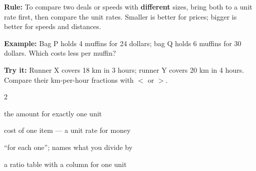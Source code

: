 \documentclass[12pt]{article}
\begin{document}

\begin{formulabox}
\textbf{Rule:} To compare two deals or speeds with \textbf{different} sizes,
bring both to a unit rate first, then compare the unit rates. Smaller is better
for prices; bigger is better for speeds and distances.
\end{formulabox}

\begin{examplebox}
\textbf{Example:} \quad Bag P holds 4 muffins for 24 dollars; bag Q holds 6
muffins for 30 dollars. Which costs less per muffin?
\end{examplebox}

\begin{tryitbox}
\textbf{Try it:} \quad Runner X covers 18 km in 3 hours; runner Y covers 20 km
in 4 hours. Compare their km-per-hour fractions with $<$ or $>$.\\[2pt]
\end{tryitbox}

\vspace{0.3cm}

\begin{multicols}{2}
\begin{description}[leftmargin=0.5cm, itemsep=2pt, font=\normalfont\bfseries]
  \item[Unit rate:] the amount for exactly one unit
  \item[Unit price:] cost of one item — a unit rate for money
  \item[Per:] ``for each one''; names what you divide by
  \item[Rate table:] a ratio table with a column for one unit
\end{description}
\end{multicols}
\end{document}
